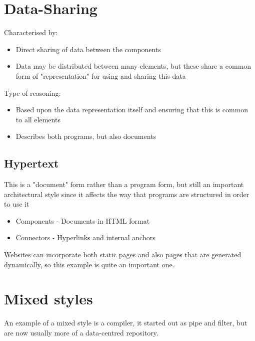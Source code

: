 \documentclass{article}[18pt]
\begin{document}
\section{Data-Sharing}
Characterised by:
\begin{itemize}
	\item Direct sharing of data between the components
	\item Data may be distributed between many elements, but these share a common form of "representation" for using and sharing this data
\end{itemize}
Type of reasoning:
\begin{itemize}
	\item Based upon the data representation itself and ensuring that this is common to all elements
	\item Describes both programs, but also documents
\end{itemize}
\subsection{Hypertext}
This is a "document" form rather than a program form, but still an important architectural style since it affects the way that programs are structured in order to use it
\begin{itemize}
	\item Components - Documents in HTML format
	\item Connectors - Hyperlinks and internal anchors
\end{itemize}
Websites can incorporate both static pages and also pages that are generated dynamically, so this example is quite an important one.
\section{Mixed styles}
An example of a mixed style is a compiler, it started out as pipe and filter, but are now usually more of a data-centred repository.
\end{document}
